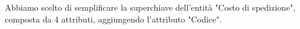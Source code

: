 Abbiamo scelto di semplificare la superchiave dell'entità "Costo di spedizione", composta da 4 attributi, aggiungendo l'attributo "Codice".


\noindent{}



\newpage
\begin{landscape} %



\end{landscape}
